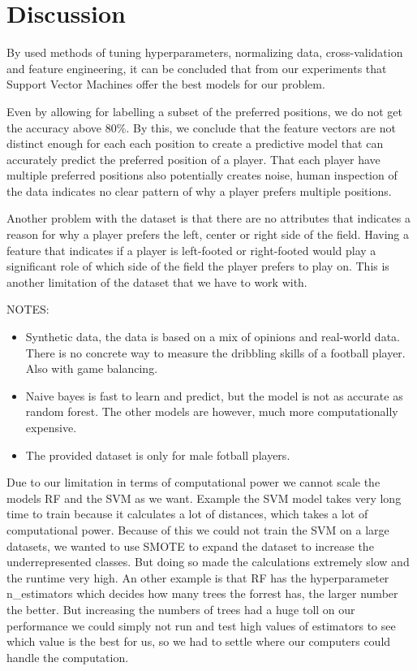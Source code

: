 \section{Discussion}

By used methods of tuning hyperparameters, normalizing data, cross-validation and feature engineering, it can be concluded that from our experiments that Support Vector Machines offer the best models for our problem. 
\par
Even by allowing for labelling a subset of the preferred positions, we do not get the accuracy above $80\%$. By this, we conclude that the feature vectors are not distinct enough for each each position to create a predictive model that can accurately predict the preferred position of a player. That each player have multiple preferred positions also potentially creates noise, human inspection of the data indicates no clear pattern of why a player prefers multiple positions.
\par
Another problem with the dataset is that there are no attributes that indicates a reason for why a player prefers the left, center or right side of the field. Having a feature that indicates if a player is left-footed or right-footed would play a significant role of which side of the field the player prefers to play on. This is another limitation of the dataset that we have to work with. 

NOTES:
\begin{itemize}
    \item Synthetic data, the data is based on a mix of opinions and real-world data. There is no concrete way to measure the dribbling skills of a football player. Also with game balancing.
    \item Naive bayes is fast to learn and predict, but the model is not as accurate as random forest. The other models are however, much more computationally expensive. 
    \item The provided dataset is only for male fotball players.
\end{itemize}



Due to our limitation in terms of computational power we cannot scale the models RF and the SVM as we want. 
Example the SVM model takes very long time to train because it calculates a lot of distances, which takes a lot of computational power. 
Because of this we could not train the SVM on a large datasets, we wanted to use SMOTE to expand the dataset to increase the underrepresented classes.
But doing so made the calculations extremely slow and the runtime very high. An other example is that RF has the hyperparameter n\_estimators which decides how many trees the forrest has, the larger number the better. 
But increasing the numbers of trees had a huge toll on our performance we could simply not run and test high values of estimators to see which value is the best for us, so we had to settle where our computers could handle the computation.




